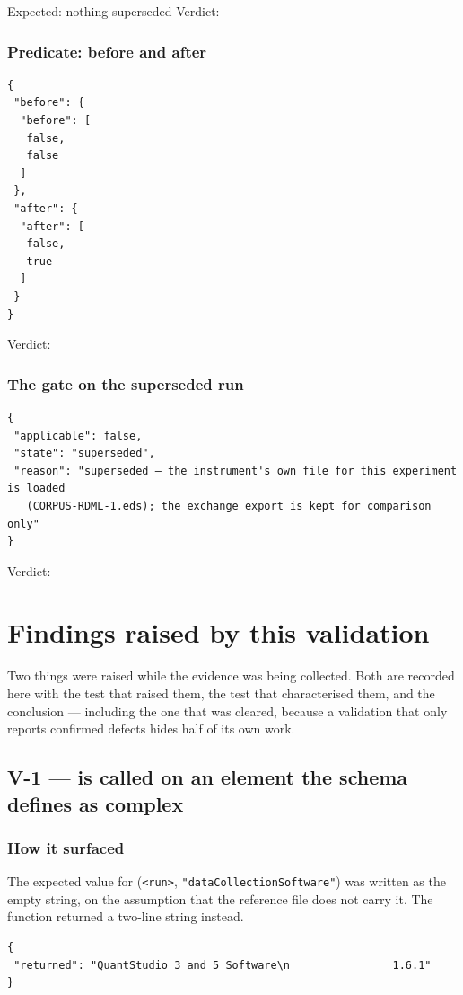 Expected: nothing superseded \hfill Verdict: \PASS
\subsection*{Predicate:  before and after}
\begin{lstlisting}[style=jstiny]
{
 "before": {
  "before": [
   false,
   false
  ]
 },
 "after": {
  "after": [
   false,
   true
  ]
 }
}
\end{lstlisting}

Verdict: \PASS
\subsection*{The gate on the superseded run}
\begin{lstlisting}[style=jstiny]
{
 "applicable": false,
 "state": "superseded",
 "reason": "superseded — the instrument's own file for this experiment is loaded
   (CORPUS-RDML-1.eds); the exchange export is kept for comparison only"
}
\end{lstlisting}

Verdict: \PASS
\chapter{Findings raised by this validation}

Two things were raised while the evidence was being collected. Both are recorded here with the test
that raised them, the test that characterised them, and the conclusion --- including the one that
was cleared, because a validation that only reports confirmed defects hides half of its own work.

\section{V-1 ---  is called on an element the schema defines as complex}\label{sec:V1}

\subsection*{How it surfaced}
The expected value for (\texttt{<run>}, \texttt{"dataCollectionSoftware"}) was written
as the empty string, on the assumption that the reference file does not carry it. The function
returned a two-line string instead.

\begin{lstlisting}[style=jstiny]
{
 "returned": "QuantStudio 3 and 5 Software\n                1.6.1"
}
\end{lstlisting}


